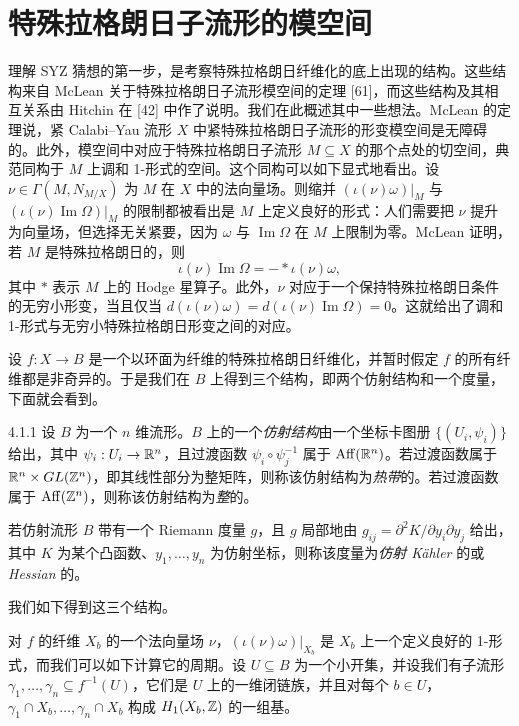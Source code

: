 \section{特殊拉格朗日子流形的模空间}
理解 SYZ 猜想的第一步，是考察特殊拉格朗日纤维化的底上出现的结构。这些结构来自 McLean 关于特殊拉格朗日子流形模空间的定理 [61]，而这些结构及其相互关系由 Hitchin 在 [42] 中作了说明。我们在此概述其中一些想法。McLean 的定理说，紧 Calabi--Yau 流形 $X$ 中紧特殊拉格朗日子流形的形变模空间是无障碍的。此外，模空间中对应于特殊拉格朗日子流形 $M\subseteq X$ 的那个点处的切空间，典范同构于 $M$ 上调和 1-形式的空间。这个同构可以如下显式地看出。设 $\nu\in\Gamma(M,N_{M/X})$ 为 $M$ 在 $X$ 中的法向量场。则缩并 $(\iota(\nu)\omega)|_M$ 与 $(\iota(\nu)\operatorname{Im}\Omega)|_M$ 的限制都被看出是 $M$ 上定义良好的形式：人们需要把 $\nu$ 提升为向量场，但选择无关紧要，因为 $\omega$ 与 $\operatorname{Im}\Omega$ 在 $M$ 上限制为零。McLean 证明，若 $M$ 是特殊拉格朗日的，则
\[
\iota(\nu)\operatorname{Im}\Omega=-\ast\iota(\nu)\omega,
\]
其中 $\ast$ 表示 $M$ 上的 Hodge 星算子。此外，$\nu$ 对应于一个保持特殊拉格朗日条件的无穷小形变，当且仅当 $d(\iota(\nu)\omega)=d(\iota(\nu)\operatorname{Im}\Omega)=0$。这就给出了调和 1-形式与无穷小特殊拉格朗日形变之间的对应。

设 $f:X\to B$ 是一个以环面为纤维的特殊拉格朗日纤维化，并暂时假定 $f$ 的所有纤维都是非奇异的。于是我们在 $B$ 上得到三个结构，即两个仿射结构和一个度量，下面就会看到。

\begin{definition}{4.1.1}
设 $B$ 为一个 $n$ 维流形。$B$ 上的一个\emph{仿射结构}由一个坐标卡图册 $\{(U_i,\psi_i)\}$ 给出，其中 $\psi_i:U_i\to\mathbb{R}^n$，且过渡函数 $\psi_i\circ\psi_j^{-1}$ 属于 $\operatorname{Aff}(\mathbb{R}^n)$。若过渡函数属于 $\mathbb{R}^n\times GL(\mathbb{Z}^n)$，即其线性部分为整矩阵，则称该仿射结构为\emph{热带}的。若过渡函数属于 $\operatorname{Aff}(\mathbb{Z}^n)$，则称该仿射结构为\emph{整}的。  %
\end{definition}

若仿射流形 $B$ 带有一个 Riemann 度量 $g$，且 $g$ 局部地由 $g_{ij}=\partial^2K/\partial y_i\partial y_j$ 给出，其中 $K$ 为某个凸函数、$y_1,\dots,y_n$ 为仿射坐标，则称该度量为\emph{仿射 Kähler} 的或 \emph{Hessian} 的。

我们如下得到这三个结构。

对 $f$ 的纤维 $X_b$ 的一个法向量场 $\nu$，$(\iota(\nu)\omega)|_{X_b}$ 是 $X_b$ 上一个定义良好的 1-形式，而我们可以如下计算它的周期。设 $U\subseteq B$ 为一个小开集，并设我们有子流形 $\gamma_1,\dots,\gamma_n\subseteq f^{-1}(U)$，它们是 $U$ 上的一维闭链族，并且对每个 $b\in U$，$\gamma_1\cap X_b,\dots,\gamma_n\cap X_b$ 构成 $H_1(X_b,\mathbb{Z})$ 的一组基。
